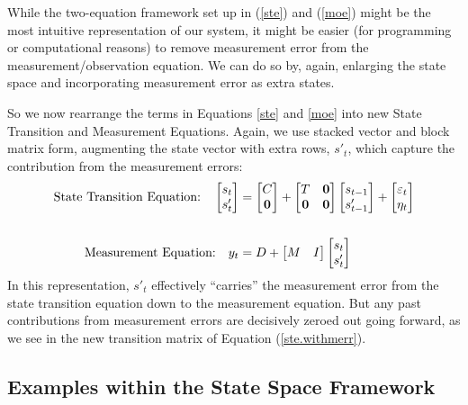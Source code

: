 \documentclass[a4paper,12pt]{article}
\begin{document}
While the two-equation framework set up in (\ref{ste}) and (\ref{moe}) might be the most intuitive representation of our system, it might be easier (for programming or computational reasons) to remove measurement error from the measurement/observation equation. We can do so by, again, enlarging the state space and incorporating measurement error as extra states.

So we now rearrange the terms in Equations \ref{ste} and \ref{moe} into new State Transition and Measurement Equations. Again, we use stacked vector and block matrix form, augmenting the state vector with extra rows, $s'_t$, which capture the contribution from the measurement errors:
\begin{align}
  \text{State Transition Equation:} \quad
    \begin{bmatrix} s_{t} \\ s'_t \end{bmatrix}
    &= \begin{bmatrix} C \\ \mathbf{0} \end{bmatrix}
    + \begin{bmatrix} T & \mathbf{0} \\ 
    \mathbf{0} & \mathbf{0} \end{bmatrix}
    \begin{bmatrix} s_{t-1} \\ s'_{t-1} \end{bmatrix}
    + \begin{bmatrix} \varepsilon_{t} \\ \eta_t \end{bmatrix}
    \label{ste.withmerr}
  \\ \notag \\
  \text{Measurement Equation:} \quad
    y_{t} &= D + 
    \begin{bmatrix} M & I \end{bmatrix}
    \begin{bmatrix} s_{t} \\ s'_t \end{bmatrix}
\end{align}
In this representation, $s'_t$ effectively ``carries'' the measurement error from the state transition equation down to the measurement equation. But any past contributions from measurement errors are decisively zeroed out going forward, as we see in the new transition matrix of Equation (\ref{ste.withmerr}).


\subsection{Examples within the State Space Framework}
\end{document}
